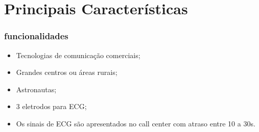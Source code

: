 \documentclass{beamer}
\begin{document}


\section{Principais Características}

\begin{frame}
	\frametitle{funcionalidades}

	\begin{itemize}
		\item Tecnologias de comunicação comerciais;
		\item Grandes centros ou áreas rurais;
		\item Astronautas;
		\item 3 eletrodos para ECG;
		\item Os sinais de ECG são apresentados no call center com atraso entre 10 a 30s.
	\end{itemize}
\end{frame}
\end{document}
